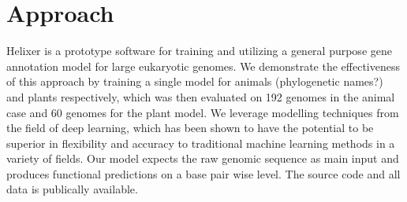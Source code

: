\documentclass{bioinfo}
\begin{document}
\section{Approach}
Helixer is a prototype software for training and utilizing a general purpose gene annotation model for large eukaryotic genomes. We demonstrate the effectiveness of this approach by training a single model for animals (phylogenetic names?) and plants respectively, which was then evaluated on 192 genomes in the animal case and 60 genomes for the plant model. We leverage modelling techniques from the field of deep learning, which has been shown to have the potential to be superior in flexibility and accuracy to traditional machine learning methods in a variety of fields. Our model expects the raw genomic sequence as main input and produces functional predictions on a base pair wise level. The source code and all data is publically available.
\end{document}
